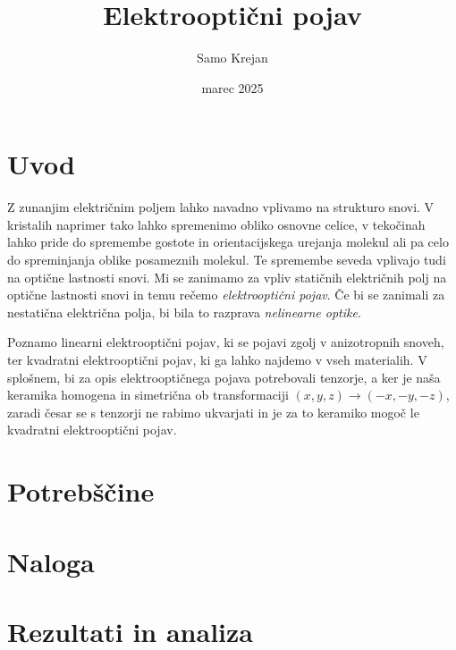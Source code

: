 \documentclass[12pt]{article}
\title{\textbf{Elektrooptični pojav}}
\author{Samo Krejan}
\date{marec 2025}
\begin{document}
\maketitle

\section{Uvod}

Z zunanjim električnim poljem lahko navadno vplivamo na strukturo snovi. V kristalih naprimer tako lahko spremenimo obliko osnovne celice, v tekočinah lahko pride do spremembe gostote in orientacijskega urejanja molekul ali pa celo do spreminjanja oblike posameznih molekul. Te spremembe seveda vplivajo tudi na optične lastnosti snovi. Mi se zanimamo za vpliv statičnih električnih polj na optične lastnosti snovi in temu rečemo \textit{elektrooptični pojav}. Če bi se zanimali za nestatična električna polja, bi bila to razprava \textit{nelinearne optike}.

Poznamo linearni elektrooptični pojav, ki se pojavi zgolj v anizotropnih snoveh, ter kvadratni elektrooptični pojav, ki ga lahko najdemo v vseh materialih. V splošnem, bi za opis elektrooptičnega pojava potrebovali tenzorje, a ker je naša keramika homogena in simetrična ob transformaciji $(x,y,z) \rightarrow (-x, -y,-z)$, zaradi česar se s tenzorji ne rabimo ukvarjati in je za to keramiko mogoč le kvadratni elektrooptični pojav.

\section{Potrebščine}


\section{Naloga}


\section{Rezultati in analiza}
\end{document}
